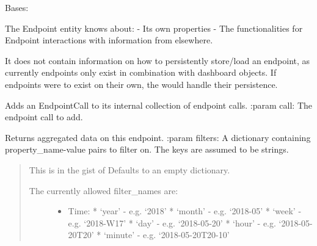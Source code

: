 \documentclass[letterpaper,10pt,english]{sphinxmanual}
\begin{document}
\begin{fulllineitems}
\label{\detokenize{pydash_app.dashboard.endpoint:pydash_app.dashboard.endpoint.Endpoint}}
Bases: 

The Endpoint entity knows about:
- Its own properties
- The functionalities for Endpoint interactions with information from elsewhere.

It does not contain information on how to persistently store/load an endpoint,
as currently endpoints only exist in combination with dashboard objects.
If endpoints were to exist on their own, the  would handle their persistence.

\begin{fulllineitems}
\label{\detokenize{pydash_app.dashboard.endpoint:pydash_app.dashboard.endpoint.Endpoint.add_endpoint_call}}
Adds an EndpointCall to its internal collection of endpoint calls.
:param call: The endpoint call to add.

\end{fulllineitems}


\begin{fulllineitems}
\label{\detokenize{pydash_app.dashboard.endpoint:pydash_app.dashboard.endpoint.Endpoint.aggregated_data}}
Returns aggregated data on this endpoint.
:param filters: A dictionary containing property\_name-value pairs to filter on. The keys are assumed to be strings.
\begin{quote}

This is in the gist of 
Defaults to an empty dictionary.
\begin{description}
\item[{The currently allowed filter\_names are:}] \leavevmode\begin{itemize}
\item {} 
Time:
* ‘year’   - e.g. ‘2018’
* ‘month’  - e.g. ‘2018-05’
* ‘week’   - e.g. ‘2018-W17’
* ‘day’    - e.g. ‘2018-05-20’
* ‘hour’   - e.g. ‘2018-05-20T20’
* ‘minute’ - e.g. ‘2018-05-20T20-10’


\end{itemize}
\end{description}
\end{quote}
\end{fulllineitems}
\end{fulllineitems}
\end{document}
